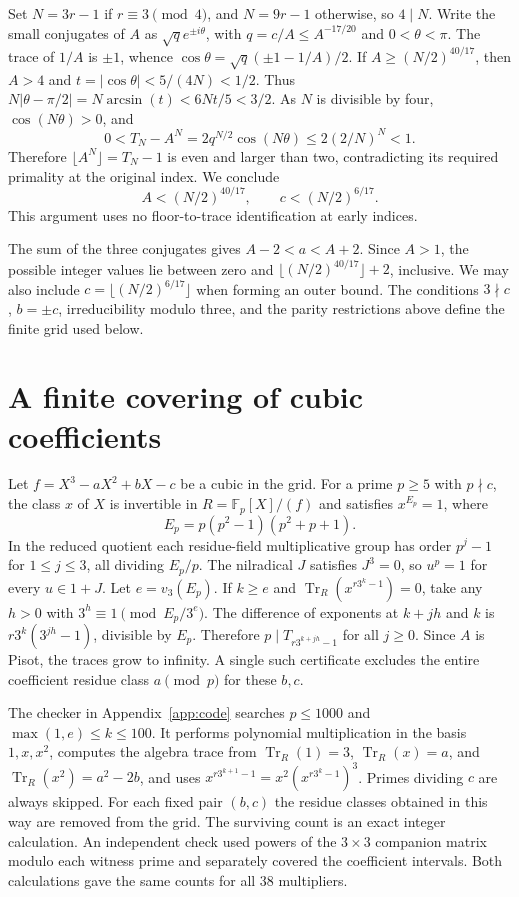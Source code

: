 \documentclass[11pt]{article}
\begin{document}
Set $N=3r-1$ if $r\equiv3\pmod4$, and $N=9r-1$ otherwise, so $4\mid N$.
Write the small conjugates of $A$ as $\sqrt q e^{\pm i\theta}$, with
$q=c/A\le A^{-17/20}$ and $0<\theta<\pi$. The trace of $1/A$ is
$\pm1$, whence $\cos\theta=\sqrt q(\pm1-1/A)/2$.
If $A\ge(N/2)^{40/17}$, then $A>4$ and
$t=|\cos\theta|<5/(4N)<1/2$. Thus
$N|\theta-\pi/2|=N\arcsin(t)<6Nt/5<3/2$.
As $N$ is divisible by four, $\cos(N\theta)>0$, and
\[
 0< T_N-A^N=2q^{N/2}\cos(N\theta)\le2(2/N)^N<1.
\]
Therefore $\lfloor A^N\rfloor=T_N-1$ is even and larger than two,
contradicting its required primality at the original index. We conclude
\[
 A<(N/2)^{40/17},\qquad c<(N/2)^{6/17}.
\]
This argument uses no floor-to-trace identification at early indices.

The sum of the three conjugates gives $A-2<a<A+2$. Since $A>1$,
the possible integer values lie between zero and
$\lfloor(N/2)^{40/17}\rfloor+2$, inclusive. We may also include
$c=\lfloor(N/2)^{6/17}\rfloor$ when forming an outer bound. The
conditions $3\nmid c$, $b=\pm c$, irreducibility modulo three, and the
parity restrictions above define the finite grid used below.
\section{A finite covering of cubic coefficients}
Let $f=X^3-aX^2+bX-c$ be a cubic in the grid. For a prime $p\ge5$ with $p\nmid c$, the class $x$
of $X$ is invertible in $R=\mathbb F_p[X]/(f)$ and satisfies
$x^{E_p}=1$, where
\[
 E_p=p(p^2-1)(p^2+p+1).
\]
In the reduced quotient each residue-field multiplicative group has
order $p^j-1$ for $1\le j\le3$, all dividing $E_p/p$.
The nilradical $J$ satisfies $J^3=0$, so $u^p=1$ for every $u\in1+J$.
Let $e=v_3(E_p)$. If $k\ge e$ and
$\operatorname{Tr}_R(x^{r3^k-1})=0$, take any $h>0$ with
$3^h\equiv1\pmod{E_p/3^e}$. The difference of exponents at
$k+jh$ and $k$ is $r3^k(3^{jh}-1)$, divisible by $E_p$. Therefore
$p\mid T_{r3^{k+jh}-1}$ for all $j\ge0$. Since $A$ is Pisot, the
traces grow to infinity. A single such certificate excludes the entire
coefficient residue class $a\pmod p$ for these $b,c$.

The checker in Appendix~\ref{app:code} searches $p\le1000$ and
$\max(1,e)\le k\le100$. It performs polynomial multiplication in the
basis $1,x,x^2$, computes the algebra trace from
$\operatorname{Tr}_R(1)=3$, $\operatorname{Tr}_R(x)=a$, and
$\operatorname{Tr}_R(x^2)=a^2-2b$, and uses
$x^{r3^{k+1}-1}=x^2(x^{r3^k-1})^3$.
Primes dividing $c$ are always skipped. For each fixed pair
$(b,c)$ the residue classes obtained in this way are removed from the
grid. The surviving count is an exact integer calculation. An independent check
used powers of the $3\times3$ companion matrix modulo each witness prime
and separately covered the coefficient intervals. Both calculations
gave the same counts for all 38 multipliers.
\end{document}
